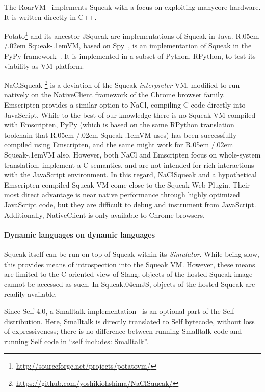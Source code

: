 \documentclass[natbib]{sigplanconf}
\newcommand*\SqueakJS{Squeak\texorpdfstring{\kern.04em}{}JS\xspace}
\newcommand*\JS{JavaScript\xspace}
\newcommand*\RSqueakVM{R\kern.05em /\kern.02em Squeak\kern-.1emVM\xspace}
\begin{document}
The RoarVM~\cite{Ungar+2009:Hosting-an-object-heap} implements Squeak
with a focus on exploiting manycore hardware. It is written directly
in C++.

Potato\footnote{\url{http://sourceforge.net/projects/potatovm/}} and
its ancestor {JSqueak} are implementations of Squeak in Java.
\RSqueakVM, based on
Spy~\cite{Bolz+2008:Back-to-the-Future-in-One-Week}, is an
implementation of Squeak in the PyPy framework~\cite{Wassermann13}. It
is implemented in a subset of Python, RPython, to test its viability
as \ac{VM} platform.

NaClSqueak%
\footnote{\url{https://github.com/yoshikiohshima/NaClSqueak/}} is a
deviation of the Squeak \emph{interpreter} \ac{VM}, modified to run
natively on the NativeClient framework of the Chrome browser family.
Emscripten provides a similar option to NaCl, compiling C code
directly into \JS. While to the best of our knowledge there is no
Squeak \ac{VM} compiled with Emscripten, PyPy (which is based on the
same RPython translation toolchain that \RSqueakVM uses) has been
successfully compiled using Emscripten, and the same might work for
\RSqueakVM also. However, both NaCl and Emscripten focus on
whole-system translation, implement a C semantics, and are not
intended for rich interactions with the \JS environment. In this
regard, NaClSqueak and a hypothetical Emscripten-compiled Squeak
\ac{VM} come close to the Squeak Web Plugin. Their most direct
advantage is near native performance through highly optimized \JS
code, but they are difficult to debug and instrument from \JS.
Additionally, NativeClient is only available to Chrome browsers.

\paragraph{Dynamic languages on dynamic languages}
\label{sec:dynam-lang-impl}

Squeak itself can be run on top of Squeak within its
\emph{Simulator}. While being slow, this provides means of
introspection into the Squeak \ac{VM}. However, these means are
limited to the C-oriented view of Slang; objects of the hosted Squeak
image cannot be accessed as such. In \SqueakJS, objects of the hosted
Squeak are readily available.

Since Self 4.0, a Smalltalk
implementation~\cite{wolczko:1996:self-includes:} is an optional part
of the Self distribution. Here, Smalltalk is directly translated to
Self bytecode, without loss of expressiveness; there is no difference
between running Smalltalk code and running Self code in ``self
includes: Smalltalk''.
\end{document}
